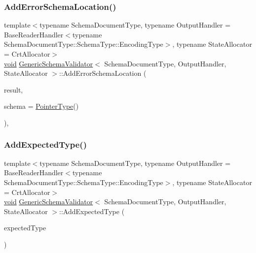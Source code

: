 \mbox{\label{classGenericSchemaValidator_abc04c7dc0ec538a08f62c76a41ce0e9a}} 
\subsubsection{\texorpdfstring{Add\+Error\+Schema\+Location()}{AddErrorSchemaLocation()}}
{\footnotesize\ttfamily template$<$typename Schema\+Document\+Type, typename Output\+Handler = Base\+Reader\+Handler$<$typename Schema\+Document\+Type\+::\+Schema\+Type\+::\+Encoding\+Type$>$, typename State\+Allocator = Crt\+Allocator$>$ \\
\hyperlink{imgui__impl__opengl3__loader_8h_ac668e7cffd9e2e9cfee428b9b2f34fa7}{void} \hyperlink{classGenericSchemaValidator}{Generic\+Schema\+Validator}$<$ Schema\+Document\+Type, Output\+Handler, State\+Allocator $>$\+::Add\+Error\+Schema\+Location (\begin{DoxyParamCaption}\item[{\hyperlink{classGenericSchemaValidator_a435890a2dddeecb896d4ac76de03ca68}{Value\+Type} \&}]{result,  }\item[{\hyperlink{classGenericSchemaValidator_ae0c6c9a9c0ff6bae80e75c6705f2668b}{Pointer\+Type}}]{schema = {\ttfamily \hyperlink{classGenericSchemaValidator_ae0c6c9a9c0ff6bae80e75c6705f2668b}{Pointer\+Type}()} }\end{DoxyParamCaption})\hspace{0.3cm}{\ttfamily [inline]}, {\ttfamily [private]}}

\mbox{\label{classGenericSchemaValidator_a68e5308e5ca9726ee66139a212b63bcc}} 
\subsubsection{\texorpdfstring{Add\+Expected\+Type()}{AddExpectedType()}}
{\footnotesize\ttfamily template$<$typename Schema\+Document\+Type, typename Output\+Handler = Base\+Reader\+Handler$<$typename Schema\+Document\+Type\+::\+Schema\+Type\+::\+Encoding\+Type$>$, typename State\+Allocator = Crt\+Allocator$>$ \\
\hyperlink{imgui__impl__opengl3__loader_8h_ac668e7cffd9e2e9cfee428b9b2f34fa7}{void} \hyperlink{classGenericSchemaValidator}{Generic\+Schema\+Validator}$<$ Schema\+Document\+Type, Output\+Handler, State\+Allocator $>$\+::Add\+Expected\+Type (\begin{DoxyParamCaption}\item[{const typename Schema\+Type\+::\+Value\+Type \&}]{expected\+Type }\end{DoxyParamCaption})\hspace{0.3cm}{\ttfamily [inline]}}

